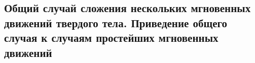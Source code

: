 

\subsection{Общий случай сложения нескольких мгновенных движений твердого тела. Приведение общего случая к случаям простейших мгновенных движений}



